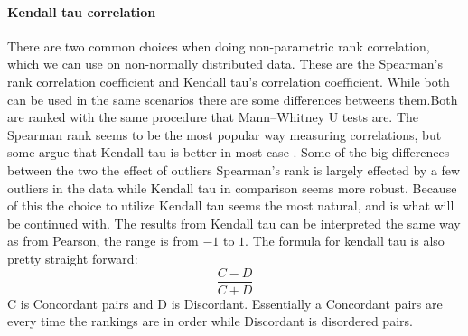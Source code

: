 \paragraph{Kendall tau correlation}
There are two common choices when doing non-parametric rank correlation, which we can use on non-normally distributed data. These are the Spearman's rank correlation coefficient and Kendall tau's correlation coefficient. While both can be used in the same scenarios there are some differences betweens them.Both are ranked with the same procedure that Mann–Whitney U tests are. The Spearman rank seems to be the most popular way measuring correlations, but some argue that Kendall tau is better in most case \cite{gilpin1993table}. Some of the big differences between the two the effect of outliers Spearman's rank is largely effected by a few outliers in the data while Kendall tau in comparison seems more robust. Because of this the choice to utilize Kendall tau seems the most natural, and is what will be continued with. The results from Kendall tau can be interpreted the same way as from Pearson, the range is from $-1$ to $1$. The formula for kendall tau is also pretty straight forward:
$$\frac{C-D}{C+D}$$
C is Concordant pairs and D is Discordant. Essentially a Concordant pairs are every time the rankings are in order while Discordant is disordered pairs.
